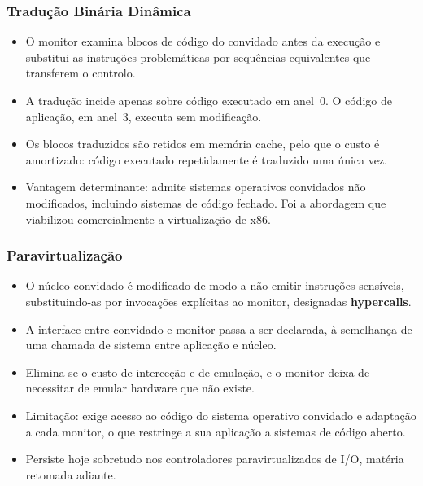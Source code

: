 \documentclass[aspectratio=169]{beamer}
\begin{document}
\begin{frame}
\frametitle{Tradução Binária Dinâmica}
\begin{itemize}
    \setlength\itemsep{0.35cm}
    \item O monitor examina blocos de código do convidado antes da execução e substitui as instruções problemáticas por sequências equivalentes que transferem o controlo.
    \item A tradução incide apenas sobre código executado em anel~0. O código de aplicação, em anel~3, executa sem modificação.
    \item Os blocos traduzidos são retidos em memória cache, pelo que o custo é amortizado: código executado repetidamente é traduzido uma única vez.
    \item Vantagem determinante: admite sistemas operativos convidados não modificados, incluindo sistemas de código fechado. Foi a abordagem que viabilizou comercialmente a virtualização de x86.
\end{itemize}
\end{frame}

\begin{frame}
\frametitle{Paravirtualização}
\begin{itemize}
    \setlength\itemsep{0.35cm}
    \item O núcleo convidado é modificado de modo a não emitir instruções sensíveis, substituindo-as por invocações explícitas ao monitor, designadas \textbf{hypercalls}.
    \item A interface entre convidado e monitor passa a ser declarada, à semelhança de uma chamada de sistema entre aplicação e núcleo.
    \item Elimina-se o custo de interceção e de emulação, e o monitor deixa de necessitar de emular hardware que não existe.
    \item Limitação: exige acesso ao código do sistema operativo convidado e adaptação a cada monitor, o que restringe a sua aplicação a sistemas de código aberto.
    \item Persiste hoje sobretudo nos controladores paravirtualizados de I/O, matéria retomada adiante.
\end{itemize}
\end{frame}
\end{document}
